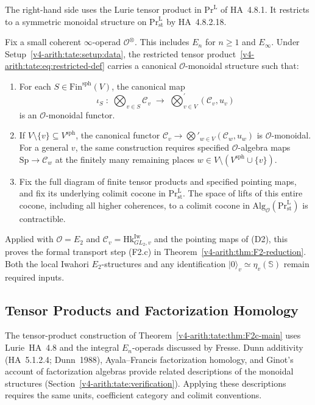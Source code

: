 The right-hand side uses the Lurie tensor product in
\(\mathrm{Pr}^{\mathrm{L}}\) of HA~4.8.1. It restricts to a
symmetric monoidal structure on \(\mathrm{Pr}^{\mathrm{L}}_{\mathrm{st}}\)
by HA~4.8.2.18.

\begin{theorem}
\label{v4-arith:tate:thm:F2c-main}
\ClaimStatusProvedHere Fix a small coherent \(\infty\)-operad
\(\mathcal O^{\otimes}\). This includes \(E_n\) for \(n\geq1\)
and \(E_\infty\). Under Setup~\ref{v4-arith:tate:setup:data},
the restricted tensor product~\eqref{v4-arith:tate:eq:restricted-def}
carries a canonical \(\mathcal{O}\)-monoidal structure such that:
\begin{enumerate}
\item[(M1)] For each \(S\in\mathrm{Fin}^{\mathrm{sph}}(V)\), the
canonical map
\[
\iota_{S}\;:\;\bigotimes_{v\in S}\mathcal{C}_{v}\;\longrightarrow\;\bigotimes_{v\in V}^{\prime}(\mathcal{C}_{v},u_{v})
\]
is an \(\mathcal{O}\)-monoidal functor.
\item[(M2)] If \(V\setminus\{v\}\subseteq V^{\mathrm{sph}}\), the
canonical functor
\(\mathcal{C}_{v}\to\bigotimes'_{w\in V}(\mathcal{C}_{w},u_{w})\)
is \(\mathcal{O}\)-monoidal. For a general \(v\), the same
construction requires specified \(\mathcal O\)-algebra maps
\(\mathrm{Sp}\to\mathcal C_w\) at the finitely many remaining
places \(w\in V\setminus(V^{\mathrm{sph}}\cup\{v\})\).
\item[(M3)] Fix the full diagram of finite tensor products and
specified pointing maps, and fix its underlying colimit cocone in
\(\mathrm{Pr}^{\mathrm L}_{\mathrm{st}}\). The space of lifts of
this entire cocone, including all higher coherences, to a colimit
cocone in
\(\mathrm{Alg}_{\mathcal O}(\mathrm{Pr}^{\mathrm L}_{\mathrm{st}})\)
is contractible.
\end{enumerate}
\end{theorem}

Applied with \(\mathcal{O}=E_{2}\) and
\(\mathcal{C}_{v}=\mathrm{Hk}^{\mathrm{Iw}}_{GL_{2},v}\) and
the pointing maps of (D2), this proves the formal transport step
(F2.c) in Theorem~\ref{v4-arith:thm:F2-reduction}. Both the local
Iwahori \(E_2\)-structures and any identification
\(|0\rangle_v\simeq\eta_v(\mathbb S)\) remain required inputs.

\subsection{Tensor Products and Factorization Homology}
The tensor-product construction of Theorem~\ref{v4-arith:tate:thm:F2c-main}
uses Lurie~HA~4.8 and the integral \(E_n\)-operads discussed by Fresse.
Dunn additivity (HA~5.1.2.4; Dunn~1988), Ayala--Francis factorization
homology, and Ginot's account of factorization algebras provide related
descriptions of the monoidal structures
(Section~\ref{v4-arith:tate:verification}). Applying these descriptions
requires the same units, coefficient category and colimit conventions.

